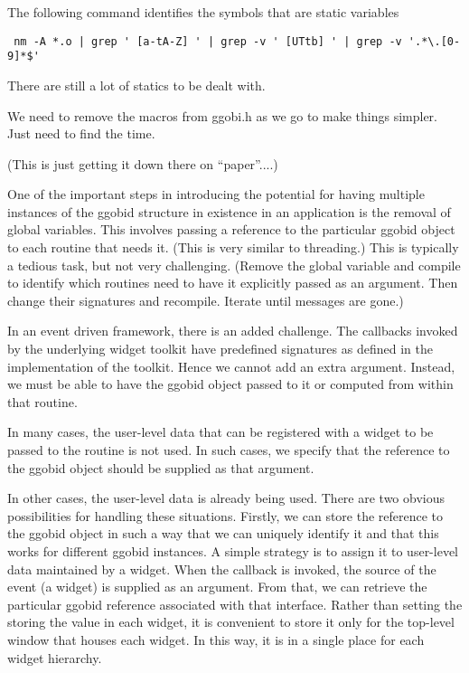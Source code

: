 \documentclass{article}
\begin{document}
The following command identifies
the symbols that are static variables
\begin{verbatim}
 nm -A *.o | grep ' [a-tA-Z] ' | grep -v ' [UTtb] ' | grep -v '.*\.[0-9]*$'
\end{verbatim}

There are still a lot of statics to be dealt with.

We need to remove the macros from ggobi.h as we go to
make things simpler. Just need to find the time.

(This is just getting it down there on ``paper''....)



One of the important steps in introducing the potential for having
multiple instances of the ggobid structure in existence in an
application is the removal of global variables.  This involves passing
a reference to the particular ggobid object to each routine that needs
it. (This is very similar to threading.)  This is typically a tedious
task, but not very challenging.  (Remove the global variable and
compile to identify which routines need to have it explicitly passed
as an argument.  Then change their signatures and recompile.  Iterate
until messages are gone.)

In an event driven framework, there is an added challenge.  The
callbacks invoked by the underlying widget toolkit have predefined
signatures as defined in the implementation of the toolkit.  Hence we
cannot add an extra argument.  Instead, we must be able to have the
ggobid object passed to it or computed from within that routine.

In many cases, the user-level data that can be registered with a
widget to be passed to the routine is not used.  In such cases, we
specify that the reference to the ggobid object should be supplied as
that argument.

In other cases, the user-level data is already being used.  There are
two obvious possibilities for handling these situations.  Firstly, we
can store the reference to the ggobid object in such a way that we can
uniquely identify it and that this works for different ggobid
instances. A simple strategy is to assign it to user-level data
maintained by a widget.  When the callback is invoked, the source of
the event (a widget) is supplied as an argument. From that, we can
retrieve the particular ggobid reference associated with that
interface. Rather than setting the storing the value in each widget,
it is convenient to store it only for the top-level window that houses
each widget. In this way, it is in a single place for each widget
hierarchy.
\end{document}
